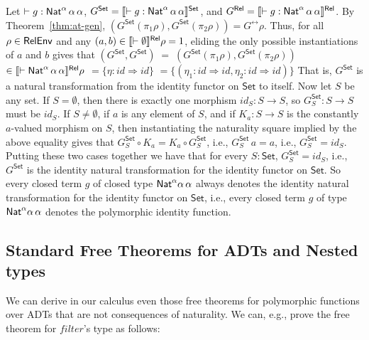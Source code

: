 \documentclass[runningheads]{llncs}
\newcommand{\set}{\mathsf{Set}}
\renewcommand{\id}{\mathit{id}}
\renewcommand{\id}{\mathit{id}}
\begin{document}
Let $ \vdash g : \mathsf{Nat}^\alpha \,\alpha\,\alpha$, \/$G^\set =
\setsem{\vdash g : \Nat^\alpha \,\alpha\,\alpha}$, and $G^{\mathsf{Rel}} =
\llbracket{\vdash g : \mathsf{Nat}^\alpha \,\alpha\,\alpha}\rrbracket^{\mathsf{Rel}}$.  By
Theorem~\ref{thm:at-gen}, $(G^\set(\pi_1\rho),G^\set(\pi_2\rho)) =
G^\rel\rho$. Thus, for all $\rho \in \mathsf{RelEnv}$ and any $(a, b) \in
\llbracket{\vdash \emptyset}\rrbracket^{\mathsf{Rel}}\rho = 1$, eliding the only possible
instantiations of $a$ and $b$ gives that $(G^\set, G^\set) \; = \;
(G^\set(\pi_1 \rho), G^\set (\pi_2 \rho))$ $ \in \llbracket{\vdash
  \mathsf{Nat}^\alpha \,\alpha\,\alpha}\rrbracket^{\mathsf{Rel}}\rho$ $ = \{\eta : \id \Rightarrow
\id\}$ $ = \{(\eta_1 : \id \Rightarrow \id, \eta_2 : \id \Rightarrow
\id)\}$ That is, $G^\set$ is a natural transformation from the
identity functor on $\set$ to itself. Now let $S$ be any set.  If $S =
\emptyset$, then there is exactly one morphism $\id_S: S \to S$, so
$G^\set_S : S \to S$ must be $\id_S$. If $S \not = \emptyset$, if $a$
is any element of $S$, and if $K_a :S \to S$ is the constantly
$a$-valued morphism on $S$, then instantiating the naturality square
implied by the above equality gives that $G^\set_S \circ K_a = K_a
\circ G^\set_S$, i.e., $G^\set_S \, a = a$, i.e., $G^\set_S = \id_S$.
Putting these two cases together we have that for every $S : \set$,
$G^\set_S = \id_S$, i.e., $G^\set$ is the identity natural
transformation for the identity functor on $\set$. So every closed
term $g$ of closed type $\mathsf{Nat}^\alpha\alpha\,\alpha$ always denotes the
identity natural transformation for the identity functor on $\set$,
i.e., every closed term $g$ of type $\mathsf{Nat}^\alpha\alpha\,\alpha$
denotes the polymorphic identity function.

\subsection{Standard Free Theorems for ADTs and Nested
  types}\label{sec:ft-adt} 

We can derive in our calculus even those free theorems for polymorphic
functions over ADTs that are not consequences of naturality.  We can,
e.g., prove the free theorem for $\mathit{filter}$'s type as follows:
\end{document}
